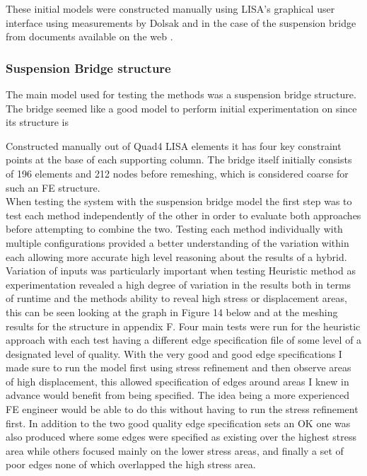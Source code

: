 \noindent
These initial models were constructed manually using LISA's graphical user interface using measurements by Dolsak and in the case of the suspension bridge from documents available on the web \cite{DolsakPaper91} \cite{SuspensionBridgeMeasurements}.

\subsubsection{Suspension Bridge structure}

The main model used for testing the methods was a suspension bridge structure. The bridge seemed like a good model to perform initial experimentation on since its structure is 


Constructed manually out of Quad4 LISA elements it has four key constraint points at the base of each supporting column. The bridge itself initially consists of 196 elements and 212 nodes before remeshing, which is considered coarse for such an FE structure. \\


\noindent
When testing the system with the suspension bridge model the first step was to test each method independently of the other in order to evaluate both approaches before attempting to combine the two. Testing each method individually with multiple configurations provided a better understanding of the variation within each allowing more accurate high level reasoning about the results of a hybrid. \\

\noindent
Variation of inputs was particularly important when testing Heuristic method as experimentation revealed a high degree of variation in the results both in terms of runtime and the methods ability to reveal high stress or displacement areas, this can be seen looking at the graph in Figure 14 below and at the meshing results for the structure in appendix F. Four main tests were run for the heuristic approach with each test having a different edge specification file of some level of a designated level of quality. With the very good and good edge specifications I made sure to run the model first using stress refinement and then observe areas of high displacement, this allowed specification of edges around areas I knew in advance would benefit from being specified. The idea being a more experienced FE engineer would be able to do this without having to run the stress refinement first. In addition to the two good quality edge specification sets an OK one was also produced where some edges were specified as existing over the highest stress area while others focused mainly on the lower stress areas, and finally a set of poor edges none of which overlapped the high stress area. \\


